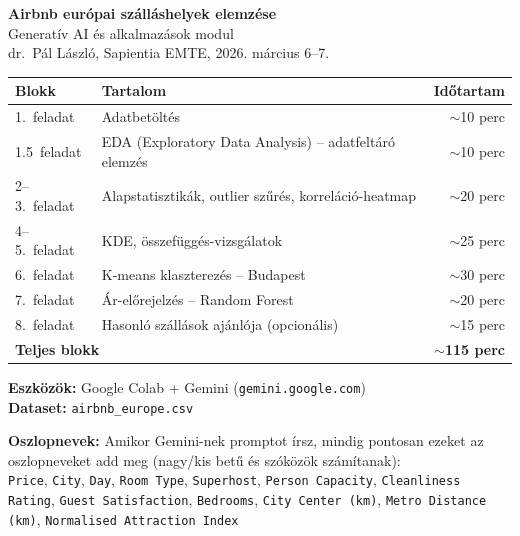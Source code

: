 \documentclass[11pt,a4paper]{article}
\begin{document}
\thispagestyle{empty}
\begin{center}
  {\LARGE\bfseries Airbnb európai szálláshelyek elemzése}\\[5pt]
  {\normalsize Generatív AI és alkalmazások modul}\\[1pt]
  {\small\color{medgray} dr.\ Pál László, Sapientia EMTE, 2026. március 6--7.}
\end{center}

\vspace{10pt}
\noindent
\begin{tabularx}{\linewidth}{lXr}
\toprule
\textbf{Blokk} & \textbf{Tartalom} & \textbf{Időtartam} \\
\midrule
1.\ feladat    & Adatbetöltés & $\sim$10 perc \\
1.5\ feladat   & EDA (Exploratory Data Analysis) -- adatfeltáró elemzés & $\sim$10 perc \\
2--3.\ feladat & Alapstatisztikák, outlier szűrés, korreláció-heatmap & $\sim$20 perc \\
4--5.\ feladat & KDE, összefüggés-vizsgálatok & $\sim$25 perc \\
6.\ feladat    & K-means klaszterezés -- Budapest & $\sim$30 perc \\
7.\ feladat    & Ár-előrejelzés -- Random Forest & $\sim$20 perc \\
8.\ feladat    & Hasonló szállások ajánlója (opcionális) & $\sim$15 perc \\
\midrule
\multicolumn{2}{l}{\textbf{Teljes blokk}} & \textbf{$\sim$115 perc} \\
\bottomrule
\end{tabularx}

\smallskip
\noindent\textbf{Eszközök:} Google Colab + Gemini (\texttt{gemini.google.com})\\
\noindent\textbf{Dataset:} \texttt{airbnb\_europe.csv}

\vspace{8pt}

\begin{tcolorbox}[warnstyle]
\textbf{\textcolor{warnborder}{Oszlopnevek:}}
Amikor Gemini-nek promptot írsz, mindig pontosan ezeket az oszlopneveket add meg
(nagy/kis betű és szóközök számítanak):\\[4pt]
\texttt{Price}, \texttt{City}, \texttt{Day}, \texttt{Room Type},
\texttt{Superhost}, \texttt{Person Capacity}, \texttt{Cleanliness Rating},
\texttt{Guest Satisfaction}, \texttt{Bedrooms},
\texttt{City Center (km)}, \texttt{Metro Distance (km)},
\texttt{Normalised Attraction Index}
\end{tcolorbox}
\end{document}
